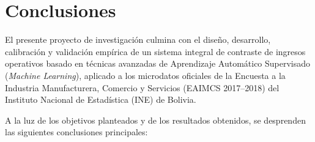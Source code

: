 \section{Conclusiones}
\label{sec:conclusiones}

El presente proyecto de investigación culmina con el diseño, desarrollo, calibración y validación empírica de un sistema integral de contraste de ingresos operativos basado en técnicas avanzadas de Aprendizaje Automático Supervisado (\textit{Machine Learning}), aplicado a los microdatos oficiales de la Encuesta a la Industria Manufacturera, Comercio y Servicios (EAIMCS 2017--2018) del Instituto Nacional de Estadística (INE) de Bolivia.

A la luz de los objetivos planteados y de los resultados obtenidos, se desprenden las siguientes conclusiones principales:

